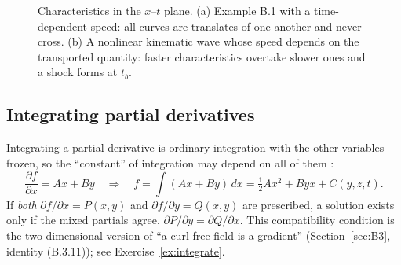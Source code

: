 \documentclass[11pt,letterpaper]{article}
\numberwithin{equation}{section}
\newcommand{\pd}[2]{\frac{\partial #1}{\partial #2}}
\begin{document}
\begin{figure}[htbp]
\centering
{}
\caption{Characteristics in the $x$--$t$ plane. (a) Example B.1 with a time-dependent speed: all curves are
translates of one another and never cross. (b) A nonlinear kinematic wave whose speed depends on the transported
quantity: faster characteristics overtake slower ones and a shock forms at $t_b$.}
\label{fig:characteristics}
\end{figure}

\subsection{Integrating partial derivatives}
Integrating a partial derivative is ordinary integration with the other variables frozen, so the ``constant''
of integration may depend on all of them \citep[pp.~888--889]{kundu2016}:
\begin{equation}
\pd{f}{x}=Ax+By\quad\Longrightarrow\quad f=\int(Ax+By)\,dx=\tfrac12Ax^2+Byx+C(y,z,t).
\end{equation}
If \emph{both} $\partial f/\partial x=P(x,y)$ and $\partial f/\partial y=Q(x,y)$ are prescribed, a solution exists only
if the mixed partials agree, $\partial P/\partial y=\partial Q/\partial x$. This compatibility condition is the
two-dimensional version of ``a curl-free field is a gradient'' (Section~\ref{sec:B3}, identity (B.3.11)); see
Exercise~\ref{ex:integrate}.
\end{document}
